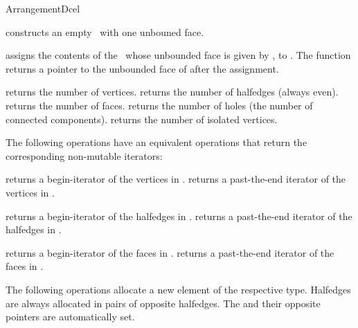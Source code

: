 \begin{ccRefConcept}{ArrangementDcel}
\ccCreation
{}
    
   {constructs an empty \dcel\ with one unbouned face.}

   {assigns the contents of the  \dcel\, whose unbounded face
    is given by , to \ccVar{}. The function returns a pointer to
    the unbounded face of \ccVar{} after the assignment.}


\ccAccessFunctions
    
    {returns the number of vertices.}
\ccGlue
{}
    {returns the number of halfedges (always even).}
\ccGlue
{}
    {returns the number of faces.}
\ccGlue
{}
    {returns the number of holes (the number of connected components).}
\ccGlue
{}
    {returns the number of isolated vertices.}

The following operations have an equivalent  operations that
return the corresponding non-mutable iterators:

   {returns a begin-iterator of the vertices in \ccVar{}.}
\ccGlue
{}
   {returns a past-the-end iterator of the vertices in \ccVar{}.}

   {returns a begin-iterator of the halfedges in \ccVar{}. }
\ccGlue
{}
   {returns a past-the-end iterator of the halfedges in \ccVar{}.}

   {returns a begin-iterator of the faces in \ccVar{}.}
\ccGlue
{}
   {returns a past-the-end iterator of the faces in \ccVar{}. }

\ccModifiers

The following operations allocate a new element of the respective type.
Halfedges are always allocated in pairs of opposite halfedges. 
The and their opposite pointers are automatically set.

\end{ccRefConcept}
